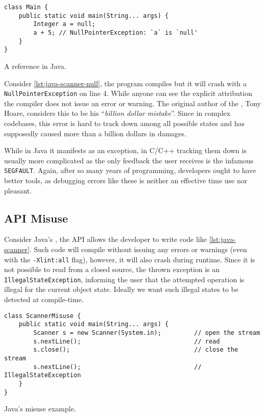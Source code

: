\begin{listing}
    \begin{verbatim}
class Main {
    public static void main(String... args) {
        Integer a = null;
        a + 5; // NullPointerException: `a` is `null'
    }
}
    \end{verbatim}
    \caption{A  reference in Java.}
    \label{lst:java-scanner-null}
\end{listing}

Consider \autoref{lst:java-scanner-null}, the program compiles but it will crash with a \texttt{NullPointerException} on line 4.
While anyone can see the explicit  attribution the compiler does not issue an error or warning.
The original author of the , Tony Hoare, considers this to be his “\emph{billion dollar mistake}”.
Since in complex codebases, this error is hard to track down among all possible states and
has supposedly caused more than a billion dollars in damages.

While in Java it manifests as an exception,
in C/C++ tracking them down is usually more complicated as the only feedback the user receives is the infamous \texttt{SEGFAULT}.
Again, after so many years of programming, developers ought to have better tools,
as debugging errors like these is neither an effective time use nor pleasant.

\subsection{API Misuse}

Consider Java's , the \gls{API} allows the developer to write code like \autoref{lst:java-scanner}.
Such code will compile without issuing any errors or warnings (even with the \texttt{-Xlint:all} flag),
however, it will also crash during runtime.
Since it is not possible to read from a closed source, the thrown exception is an \texttt{IllegalStateException},
informing the user that the attempted operation is illegal for the current object state.
Ideally we want such illegal states to be detected at compile-time.

\begin{listing}
    \begin{verbatim}
class ScannerMisuse {
    public static void main(String... args) {
        Scanner s = new Scanner(System.in);         // open the stream
        s.nextLine();                               // read
        s.close();                                  // close the stream
        s.nextLine();                               // IllegalStateException
    }
}
    \end{verbatim}
    \caption{Java's  misuse example.}
    \label{lst:java-scanner}
\end{listing}

